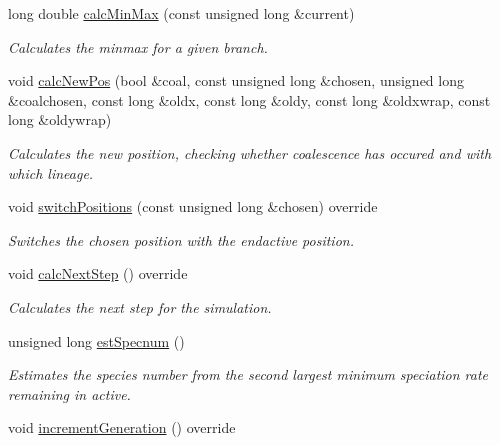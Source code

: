 \begin{DoxyCompactItemize}
long double \hyperlink{class_spatial_tree_ae6b453b80ea8ffedbbba799ac6142352}{calc\+Min\+Max} (const unsigned long \&current)
\begin{DoxyCompactList}\small\item\em Calculates the minmax for a given branch. \end{DoxyCompactList}\item 
void \hyperlink{class_spatial_tree_ac2b2ab269b36896cb41c47f750b8c032}{calc\+New\+Pos} (bool \&coal, const unsigned long \&chosen, unsigned long \&coalchosen, const long \&oldx, const long \&oldy, const long \&oldxwrap, const long \&oldywrap)
\begin{DoxyCompactList}\small\item\em Calculates the new position, checking whether coalescence has occured and with which lineage. \end{DoxyCompactList}\item 
void \hyperlink{class_spatial_tree_a71c99204503ec59815a5338ab934331d}{switch\+Positions} (const unsigned long \&chosen) override
\begin{DoxyCompactList}\small\item\em Switches the chosen position with the endactive position. \end{DoxyCompactList}\item 
void \hyperlink{class_spatial_tree_a577196761885888dcb9366ab377f98cb}{calc\+Next\+Step} () override\hypertarget{class_spatial_tree_a577196761885888dcb9366ab377f98cb}{}\label{class_spatial_tree_a577196761885888dcb9366ab377f98cb}

\begin{DoxyCompactList}\small\item\em Calculates the next step for the simulation. \end{DoxyCompactList}\item 
unsigned long \hyperlink{class_spatial_tree_a96919ff86b2a4d1de5ba14c2598a9346}{est\+Specnum} ()
\begin{DoxyCompactList}\small\item\em Estimates the species number from the second largest minimum speciation rate remaining in active. \end{DoxyCompactList}\item 
void \hyperlink{class_spatial_tree_aa5db72e986bed4b0aa81217f5be30cf4}{increment\+Generation} () override\hypertarget{class_spatial_tree_aa5db72e986bed4b0aa81217f5be30cf4}{}\label{class_spatial_tree_aa5db72e986bed4b0aa81217f5be30cf4}


\end{DoxyCompactItemize}
